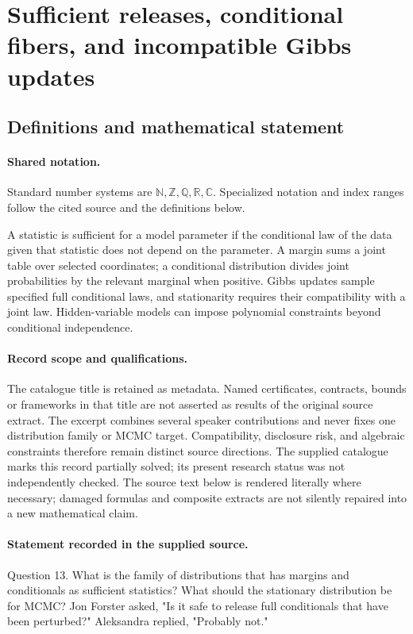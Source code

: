\documentclass[11pt]{article}
\begin{document}
\section{Sufficient releases, conditional fibers, and incompatible Gibbs updates}\label{statement}

\subsection{Definitions and mathematical statement}

\paragraph{Shared notation.}Standard number systems are $\mathbb N,\mathbb Z,\mathbb Q,\mathbb R,\mathbb C$. Specialized notation and index ranges follow the cited source and the definitions below.


A statistic is sufficient for a model parameter if the conditional law of the data given that statistic does not depend on the parameter. A margin sums a joint table over selected coordinates; a conditional distribution divides joint probabilities by the relevant marginal when positive. Gibbs updates sample specified full conditional laws, and stationarity requires their compatibility with a joint law. Hidden-variable models can impose polynomial constraints beyond conditional independence.
\paragraph{Record scope and qualifications.}
The catalogue title is retained as metadata. Named certificates, contracts, bounds or frameworks in that title are not asserted as results of the original source extract.
The excerpt combines several speaker contributions and never fixes one distribution family or MCMC target. Compatibility, disclosure risk, and algebraic constraints therefore remain distinct source directions. The supplied catalogue marks this record partially solved; its present research status was not independently checked.
The source text below is rendered literally where necessary; damaged formulas and composite extracts are not silently repaired into a new mathematical claim.
\paragraph{Statement recorded in the supplied source.}
Question 13. What is the family of distributions that has margins and conditionals as sufficient statistics? What should the stationary distribution be for MCMC? Jon Forster asked, "Is it safe to release full conditionals that have been perturbed?" Aleksandra replied, "Probably not."
\end{document}
